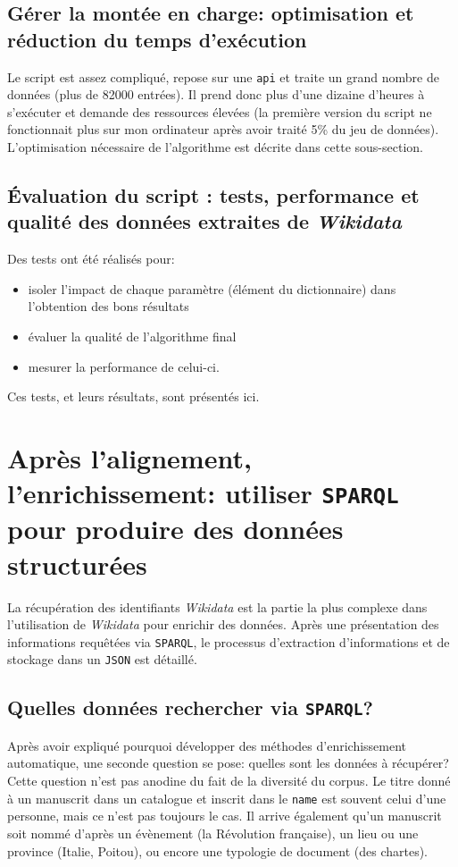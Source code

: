 \documentclass[a4paper, 12pt, twoside]{book}
\newcommand{\api}{\texttt{\gls{api}}}
\newcommand{\json}{\texttt{JSON}}
\newcommand{\sparql}{\texttt{\gls{SPARQL}}}
\newcommand{\tname}{\texttt{name}}
\newcommand{\wkd}{\textit{Wikidata}}
\begin{document}
\subsection{Gérer la montée en charge: optimisation et réduction du temps d'exécution}
Le script est assez compliqué, repose sur une \api{} et traite un grand nombre de données (plus de 82000 entrées). Il prend donc plus d'une dizaine d'heures à s'exécuter et demande des ressources élevées (la première version du script ne fonctionnait plus sur mon ordinateur après avoir traité 5\% du jeu de données). L'optimisation nécessaire de l'algorithme est décrite dans cette sous-section.

\subsection{Évaluation du script : tests, performance et qualité des données extraites de \wkd{}}
Des tests ont été réalisés pour:
\begin{itemize}
	\item isoler l'impact de chaque paramètre (élément du dictionnaire) dans l'obtention des bons résultats
	\item évaluer la qualité de l'algorithme final
	\item mesurer la performance de celui-ci.
\end{itemize}
Ces tests, et leurs résultats, sont présentés ici.

\section{Après l'alignement, l'enrichissement: utiliser \sparql{} pour produire des données structurées}
La récupération des identifiants \wkd{} est la partie la plus complexe dans l'utilisation de \wkd{} pour enrichir des données. Après une présentation des informations requêtées via \sparql{}, le processus d'extraction d'informations et de stockage dans un \json{} est détaillé.

\subsection{Quelles données rechercher via \sparql?}
Après avoir expliqué pourquoi développer des méthodes d'enrichissement automatique, une seconde question se pose: quelles sont les données à récupérer? Cette question n'est pas anodine du fait de la diversité du corpus. Le titre donné à un manuscrit dans un catalogue et inscrit dans le \tname{} est souvent celui d'une personne, mais ce n'est pas toujours le cas. Il arrive également qu'un manuscrit soit nommé d'après un évènement (la Révolution française), un lieu ou une province (Italie, Poitou), ou encore une typologie de document (des chartes).
\end{document}
